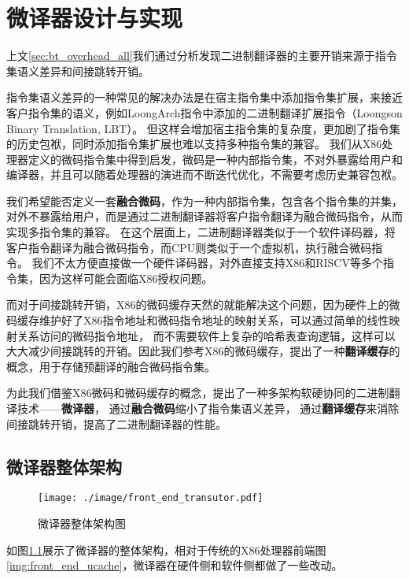 \chapter{微译器设计与实现}\label{chap:MUT}

上文\ref{sec:bt_overhead_all}我们通过分析发现二进制翻译器的主要开销来源于指令集语义差异和间接跳转开销。

指令集语义差异的一种常见的解决办法是在宿主指令集中添加指令集扩展，来接近客户指令集的语义，例如LoongArch指令中添加的二进制翻译扩展指令（Loongson Binary Translation, LBT）\cite{LoongArch2023}。
但这样会增加宿主指令集的复杂度，更加剧了指令集的历史包袱，同时添加指令集扩展也难以支持多种指令集的兼容。
我们从X86处理器定义的微码指令集中得到启发，微码是一种内部指令集，不对外暴露给用户和编译器，并且可以随着处理器的演进而不断迭代优化，不需要考虑历史兼容包袱。

我们希望能否定义一套\textbf{融合微码}，作为一种内部指令集，包含各个指令集的并集，对外不暴露给用户，而是通过二进制翻译器将客户指令翻译为融合微码指令，从而实现多指令集的兼容。
在这个层面上，二进制翻译器类似于一个软件译码器，将客户指令翻译为融合微码指令，而CPU则类似于一个虚拟机，执行融合微码指令。
我们不太方便直接做一个硬件译码器，对外直接支持X86和RISCV等多个指令集，因为这样可能会面临X86授权问题。

而对于间接跳转开销，X86的微码缓存天然的就能解决这个问题，因为硬件上的微码缓存维护好了X86指令地址和微码指令地址的映射关系，可以通过简单的线性映射关系访问的微码指令地址，
而不需要软件上复杂的哈希表查询逻辑，这样可以大大减少间接跳转的开销。因此我们参考X86的微码缓存，提出了一种\textbf{翻译缓存}的概念，用于存储预翻译的融合微码指令集。

为此我们借鉴X86微码和微码缓存的概念，提出了一种多架构软硬协同的二进制翻译技术——\textbf{微译器}，
通过\textbf{融合微码}缩小了指令集语义差异，
通过\textbf{翻译缓存}来消除间接跳转开销，提高了二进制翻译器的性能。

\section{微译器整体架构}

\begin{figure}[h]
  \centering
  \texttt{[image: ./image/front\_end\_transutor.pdf]}
  \caption{微译器整体架构图}
  \label{img:front_end_transutor}
\end{figure}

如图\ref{img:front_end_transutor}展示了微译器的整体架构，相对于传统的X86处理器前端图\ref{img:front_end_ucache}，微译器在硬件侧和软件侧都做了一些改动。

